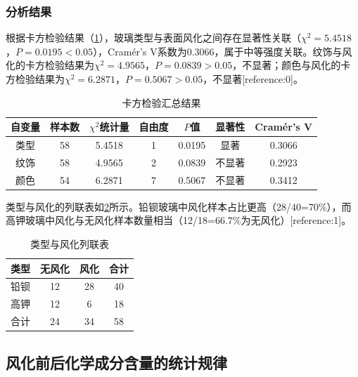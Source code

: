 \documentclass{cumcmthesis}
\begin{document}
\subsubsection{分析结果}

根据卡方检验结果（\cref{tab:chi2}），玻璃类型与表面风化之间存在显著性关联（$\chi^2 = 5.4518$，$P = 0.0195 < 0.05$），Cramér's V系数为0.3066，属于中等强度关联。纹饰与风化的卡方检验结果为$\chi^2 = 4.9565$，$P = 0.0839 > 0.05$，不显著；颜色与风化的卡方检验结果为$\chi^2 = 6.2871$，$P = 0.5067 > 0.05$，不显著[reference:0]。

\begin{table}[!htbp]
    \centering
    \caption{卡方检验汇总结果}
    \label{tab:chi2}
    \begin{tabular}{c|c|c|c|c|c|c}
        \toprule[1.5pt]
        自变量 & 样本数 & $\chi^2$统计量 & 自由度 & $P$值 & 显著性 & Cramér's V \\
        \midrule[1pt]
        类型 & 58 & 5.4518 & 1 & 0.0195 & 显著 & 0.3066 \\
        纹饰 & 58 & 4.9565 & 2 & 0.0839 & 不显著 & 0.2923 \\
        颜色 & 54 & 6.2871 & 7 & 0.5067 & 不显著 & 0.3412 \\
        \bottomrule[1.5pt]
    \end{tabular}
\end{table}

类型与风化的列联表如\cref{tab:contingency}所示。铅钡玻璃中风化样本占比更高（28/40=70\%），而高钾玻璃中风化与无风化样本数量相当（12/18=66.7\%为无风化）[reference:1]。

\begin{table}[!htbp]
    \centering
    \caption{类型与风化列联表}
    \label{tab:contingency}
    \begin{tabular}{c|c|c|c}
        \toprule[1.5pt]
        类型 & 无风化 & 风化 & 合计 \\
        \midrule[1pt]
        铅钡 & 12 & 28 & 40 \\
        高钾 & 12 & 6 & 18 \\
        合计 & 24 & 34 & 58 \\
        \bottomrule[1.5pt]
    \end{tabular}
\end{table}

\subsection{风化前后化学成分含量的统计规律}
\end{document}
